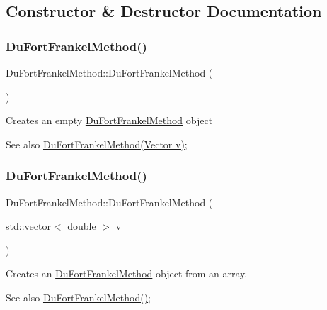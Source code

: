 \subsection{Constructor \& Destructor Documentation}
\mbox{\label{class_du_fort_frankel_method_ae4f8e7c2d498265fa8b8e6ea0bd74288}} 
\subsubsection{\texorpdfstring{Du\+Fort\+Frankel\+Method()}{DuFortFrankelMethod()}\hspace{0.1cm}{\footnotesize\ttfamily [1/2]}}
{\footnotesize\ttfamily Du\+Fort\+Frankel\+Method\+::\+Du\+Fort\+Frankel\+Method (\begin{DoxyParamCaption}{ }\end{DoxyParamCaption})}

Creates an empty \hyperlink{class_du_fort_frankel_method}{Du\+Fort\+Frankel\+Method} object \begin{DoxySeeAlso}{See also}
\hyperlink{class_du_fort_frankel_method}{Du\+Fort\+Frankel\+Method(\+Vector v)}; 
\end{DoxySeeAlso}
\mbox{\label{class_du_fort_frankel_method_a56355289a2ead5d2aa0092687804597b}} 
\subsubsection{\texorpdfstring{Du\+Fort\+Frankel\+Method()}{DuFortFrankelMethod()}\hspace{0.1cm}{\footnotesize\ttfamily [2/2]}}
{\footnotesize\ttfamily Du\+Fort\+Frankel\+Method\+::\+Du\+Fort\+Frankel\+Method (\begin{DoxyParamCaption}\item[{std\+::vector$<$ double $>$}]{v }\end{DoxyParamCaption})}

Creates an \hyperlink{class_du_fort_frankel_method}{Du\+Fort\+Frankel\+Method} object from an array. \begin{DoxySeeAlso}{See also}
\hyperlink{class_du_fort_frankel_method_ae4f8e7c2d498265fa8b8e6ea0bd74288}{Du\+Fort\+Frankel\+Method()}; 
\end{DoxySeeAlso}

